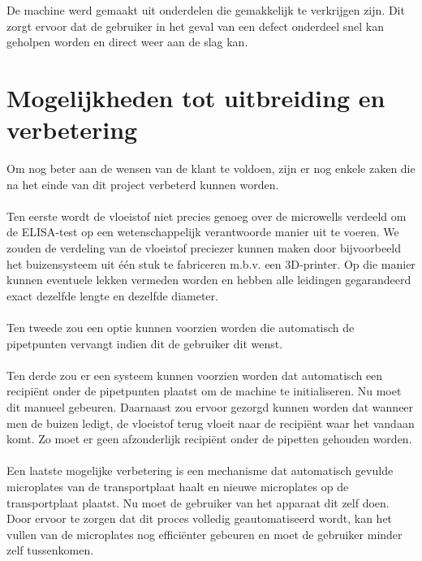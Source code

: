 \documentclass[a4paper,twoside,kulak]{kulakreport} %
\begin{document}
De machine werd gemaakt uit onderdelen die gemakkelijk te verkrijgen zijn. Dit zorgt ervoor dat de gebruiker in het geval van een defect onderdeel snel kan geholpen worden en direct weer aan de slag kan.

\chapter{Mogelijkheden tot uitbreiding en verbetering}

Om nog beter aan de wensen van de klant te voldoen, zijn er nog enkele zaken die na het einde van dit project verbeterd kunnen worden. \\ \\
Ten eerste wordt de vloeistof niet precies genoeg over de microwells verdeeld om de ELISA-test op een wetenschappelijk verantwoorde manier uit te voeren. We zouden de verdeling van de vloeistof preciezer kunnen maken door bijvoorbeeld het buizensysteem uit één stuk te fabriceren m.b.v. een 3D-printer. Op die manier kunnen eventuele lekken vermeden worden en hebben alle leidingen gegarandeerd exact dezelfde lengte en dezelfde diameter. \\ \\
Ten tweede zou een optie kunnen voorzien worden die automatisch de pipetpunten vervangt indien dit de gebruiker dit wenst. 
\\ \\
Ten derde zou er een systeem kunnen voorzien worden dat automatisch een recipiënt onder de pipetpunten plaatst om de machine te initialiseren. Nu moet dit manueel gebeuren. Daarnaast zou ervoor gezorgd kunnen worden dat wanneer men de buizen ledigt, de vloeistof terug vloeit naar de recipiënt waar het vandaan komt. Zo moet er geen afzonderlijk recipiënt onder de pipetten gehouden worden. 
\\ \\
Een laatste mogelijke verbetering is een mechanisme dat automatisch gevulde microplates  van de transportplaat haalt en nieuwe microplates op de transportplaat plaatst. Nu moet de gebruiker van het apparaat dit zelf doen. Door ervoor te zorgen dat dit proces volledig geautomatiseerd wordt, kan het vullen van de microplates nog efficiënter gebeuren en moet de gebruiker minder zelf tussenkomen. \\ \\

\end{document}
